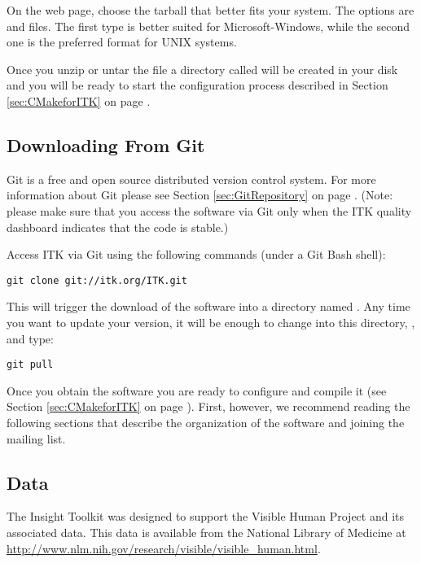 On the web page, choose the tarball that better fits your system. The options are
 and  files. The first type is better suited for
Microsoft-Windows, while the second one is the preferred format for UNIX
systems.

Once you unzip or untar the file a directory called
 will be created in your disk and
you will be ready to start the configuration process described in Section
\ref{sec:CMakeforITK} on page \pageref{sec:CMakeforITK}.

\subsection{Downloading From Git}
\label{sec:DownloadingFromGit}


Git is a free and open source distributed version control system.  For more
information about Git please see Section \ref{sec:GitRepository} on page
\pageref{sec:GitRepository}. (Note: please make sure that you access the
software via Git only when the ITK quality dashboard indicates that the code
is stable.)

Access ITK via Git using the following commands (under a Git Bash shell):
\begin{verbatim}
git clone git://itk.org/ITK.git
\end{verbatim}

This will trigger the download of the software into a directory named
.  Any time you want to update your version, it will be enough to
change into this directory, , and type:
\begin{verbatim}
git pull
\end{verbatim}

Once you obtain the software you are ready to configure and compile it (see
Section \ref{sec:CMakeforITK} on page \pageref{sec:CMakeforITK}). First,
however, we recommend reading the following sections that describe the
organization of the software and joining the mailing list.

\subsection{Data}
\label{sec:Data}

The Insight Toolkit was designed to support the Visible Human Project
and its associated data. This data is available from the National Library of
Medicine at \url{http://www.nlm.nih.gov/research/visible/visible_human.html}.

